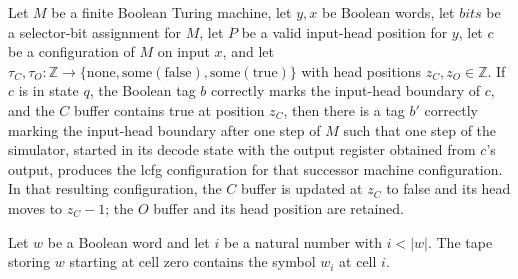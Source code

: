 \begin{theorem}
\label{Complexity.Meyer.dec_fire}
\leanok
{}
Let $M$ be a finite Boolean Turing machine, let $y,x$ be Boolean words, let $bits$ be a
selector-bit assignment for $M$, let $P$ be a valid input-head position for $y$, let $c$
be a configuration of $M$ on input $x$, and let
$\tau_C,\tau_O:\mathbb{Z}\to\{\mathrm{none},\mathrm{some} (\mathrm{false}),\mathrm{some}
(\mathrm{true})\}$ with head positions $z_C,z_O\in\mathbb{Z}$. If $c$ is in state $q$,
the Boolean tag $b$ correctly marks the input-head boundary of $c$, and the $C$ buffer
contains true at position $z_C$, then there is a tag $b'$ correctly marking the
input-head boundary after one step of $M$ such that one step of the simulator, started
in its decode state with the output register obtained from $c$'s output, produces the
lcfg configuration for that successor machine configuration. In that resulting
configuration, the $C$ buffer is updated at $z_C$ to false and its head moves to
$z_C-1$; the $O$ buffer and its head position are retained.
\end{theorem}

\begin{theorem}
\label{Complexity.Meyer.bufferTape_at}
\leanok
{}
Let $w$ be a Boolean word and let $i$ be a natural number with $i<|w|$. The tape storing
$w$ starting at cell zero contains the symbol $w_i$ at cell $i$.
\end{theorem}

